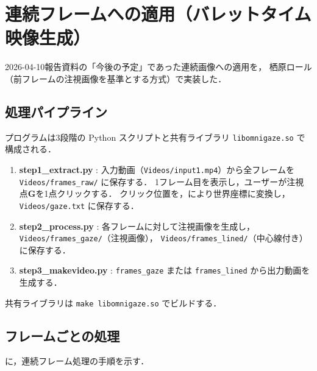 \documentclass{ltjsarticle}          %
\begin{document}
\section{連続フレームへの適用（バレットタイム映像生成）}
2026-04-10報告資料の「今後の予定」であった連続画像への適用を，
栖原ロール（前フレームの注視画像を基準とする方式）で実装した．

\subsection{処理パイプライン}
プログラムは3段階の Python スクリプトと共有ライブラリ \texttt{libomnigaze.so} で構成される．
\begin{enumerate}
  \item \textbf{step1\_extract.py} :
    入力動画（\texttt{Videos/input1.mp4}）から全フレームを
    \texttt{Videos/frames\_raw/} に保存する．
    1フレーム目を表示し，ユーザーが注視点$\bm{G}$を1点クリックする．
    クリック位置を，により世界座標に変換し，
    \texttt{Videos/gaze.txt} に保存する．

  \item \textbf{step2\_process.py} :
    各フレームに対して注視画像を生成し，
    \texttt{Videos/frames\_gaze/}（注視画像），
    \texttt{Videos/frames\_lined/}（中心線付き）に保存する．

  \item \textbf{step3\_makevideo.py} :
    \texttt{frames\_gaze} または \texttt{frames\_lined} から出力動画を生成する．
\end{enumerate}

共有ライブラリは \texttt{make libomnigaze.so} でビルドする．

\subsection{フレームごとの処理}
に，連続フレーム処理の手順を示す．
\end{document}
